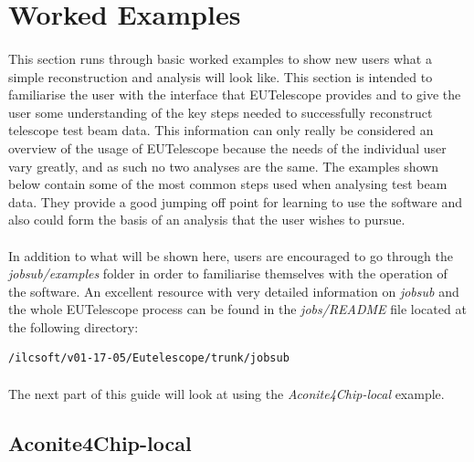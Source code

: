 \documentclass[11pt]{article}
\begin{document}
\section{Worked Examples}
\paragraph{}
This section runs through basic worked examples to show new users what a simple reconstruction and analysis will look like.  This section is intended to familiarise the user with the interface that EUTelescope provides and to give the user some understanding of the key steps needed to successfully reconstruct telescope test beam data. This information can only really be considered an overview of the usage of EUTelescope because the needs of the individual user vary greatly, and as such no two analyses are the same. The examples shown below contain some of the most common steps used when analysing test beam data. They provide a good jumping off point for learning to use the software and also could form the basis of an analysis that the user wishes to pursue.
 \paragraph{}
In addition to what will be shown here, users are encouraged to go through the \textit{jobsub/examples} folder in order to familiarise themselves with the operation of the software. An excellent resource with very detailed information on \textit{jobsub} and the whole EUTelescope process can be found in the \textit{jobs/README} file located at the following directory:
\begin{verbatim}
/ilcsoft/v01-17-05/Eutelescope/trunk/jobsub
\end{verbatim}
\paragraph{}
The next part of this guide will look at using the \textit{Aconite4Chip-local} example.
\subsection{Aconite4Chip-local}
\end{document}
